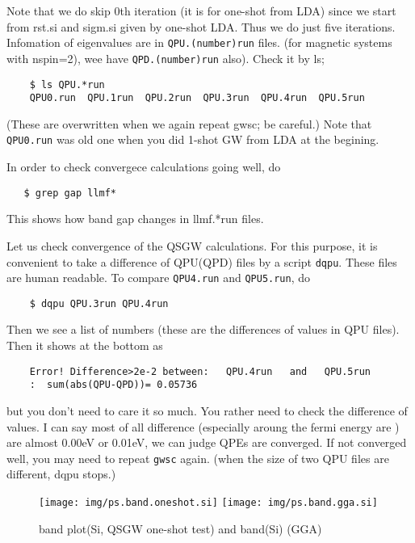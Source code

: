 \documentclass[a4paper,10pt,epsf,fleqn]{article}
\begin{document}
Note that we do skip 0th iteration (it is for one-shot from LDA) since
we start from rst.si and sigm.si given by one-shot LDA.
Thus we do just five iterations.
Infomation of eigenvalues are in \verb+QPU.(number)run+ files.
(for magnetic systems with nspin=2), wee have \verb+QPD.(number)run+ also).
Check it by ls;
\begin{verbatim}
    $ ls QPU.*run
    QPU0.run  QPU.1run  QPU.2run  QPU.3run  QPU.4run  QPU.5run
\end{verbatim}
(These are overwritten when we again repeat gwsc; be careful.)
Note that \verb+QPU0.run+ was old one when you did 1-shot GW from LDA 
at the begining.

In order to check convergece calculations going well, do
\begin{verbatim}
   $ grep gap llmf*
\end{verbatim}
This shows how band gap changes in llmf.*run files.

Let us check convergence of the QSGW calculations.
For this purpose, it is convenient to take a difference of QPU(QPD) files
by a script \verb+dqpu+. These files are human readable.
To compare \verb+QPU4.run+ and \verb+QPU5.run+, do
\begin{verbatim}
    $ dqpu QPU.3run QPU.4run
\end{verbatim}
Then we see a list of numbers (these are the differences of values in
QPU files).  Then it shows at the bottom as
\begin{verbatim}
    Error! Difference>2e-2 between:   QPU.4run   and   QPU.5run  
    :  sum(abs(QPU-QPD))= 0.05736
\end{verbatim}
but you don't need to care it so much.
You rather need to check the difference of values.
I can say most of all difference (especially aroung the fermi energy are
) are almost 0.00eV or 0.01eV, we can judge QPEs are converged.
If not converged well, you may need to repeat 
\verb+gwsc+ again.
(when the size of two QPU files are different, dqpu stops.)

\begin{figure}[h]
 \begin{center}
  \texttt{[image: img/ps.band.oneshot.si]}
  \texttt{[image: img/ps.band.gga.si]}
  \caption{band plot(Si, QSGW one-shot test)    and    band(Si) (GGA)}
 \end{center}
\end{figure}

\end{document}
